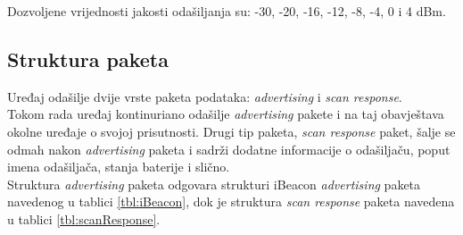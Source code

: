 Dozvoljene vrijednosti jakosti odašiljanja su: -30, -20, -16, -12, -8, -4, 0 i 4 dBm.


\subsection*{Struktura paketa}
Uređaj odašilje dvije vrste paketa podataka: \textit{advertising} i \textit{scan response}.
\\
Tokom rada uređaj kontinuriano odašilje \textit{advertising} pakete i na taj obavještava okolne uređaje o svojoj prisutnosti. 
Drugi tip paketa, \textit{scan response} paket, šalje se odmah nakon \textit{advertising} paketa i sadrži dodatne informacije o odašiljaču, poput imena odašiljača, stanja baterije i slično.
\\

Struktura \textit{advertising} paketa odgovara strukturi iBeacon \textit{advertising} paketa navedenog u tablici \ref{tbl:iBeacon}, dok je struktura \textit{scan response} paketa navedena u tablici \ref{tbl:scanResponse}.
\\

